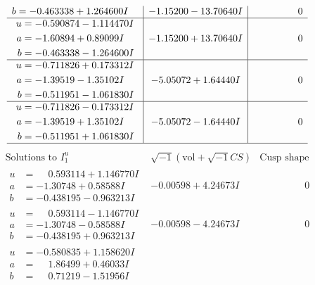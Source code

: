 \documentclass[1p]{elsarticle_modified}
\theoremstyle{definition}
\newcommand{\I}{\sqrt{-1}}
\begin{document}
$$\begin{array}{c|c|c}
\begin{aligned}
b &= -0.463338 + 1.264600 I\end{aligned}
 & -1.15200 - 13.70640 I & \phantom{-0.000000 } 0 \\ \hline\begin{aligned}
u &= -0.590874 - 1.114470 I \\
a &= -1.60894 + 0.89099 I \\
b &= -0.463338 - 1.264600 I\end{aligned}
 & -1.15200 + 13.70640 I & \phantom{-0.000000 } 0 \\ \hline\begin{aligned}
u &= -0.711826 + 0.173312 I \\
a &= -1.39519 - 1.35102 I \\
b &= -0.511951 - 1.061830 I\end{aligned}
 & -5.05072 + 1.64440 I & \phantom{-0.000000 } 0 \\ \hline\begin{aligned}
u &= -0.711826 - 0.173312 I \\
a &= -1.39519 + 1.35102 I \\
b &= -0.511951 + 1.061830 I\end{aligned}
 & -5.05072 - 1.64440 I & \phantom{-0.000000 } 0\\
 \hline 
 \end{array}$$\newpage$$\begin{array}{c|c|c}  
\text{Solutions to }I^u_{1}& \I (\text{vol} + \sqrt{-1}CS) & \text{Cusp shape}\\
 \hline 
\begin{aligned}
u &= \phantom{-}0.593114 + 1.146770 I \\
a &= -1.30748 + 0.58588 I \\
b &= -0.438195 - 0.963213 I\end{aligned}
 & -0.00598 + 4.24673 I & \phantom{-0.000000 } 0 \\ \hline\begin{aligned}
u &= \phantom{-}0.593114 - 1.146770 I \\
a &= -1.30748 - 0.58588 I \\
b &= -0.438195 + 0.963213 I\end{aligned}
 & -0.00598 - 4.24673 I & \phantom{-0.000000 } 0 \\ \hline\begin{aligned}
u &= -0.580835 + 1.158620 I \\
a &= \phantom{-}1.86499 + 0.46033 I \\
b &= \phantom{-}0.71219 - 1.51956 I\end{aligned}

\end{array}$$
\end{document}
